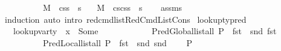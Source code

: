 \begin{isabellebody}
\ \ \ \ \ \ \ \ \ \ {\isachardoublequoteopen}M{\isacharcomma}{\kern0pt}{\isasymLambda}{\isacharcomma}{\kern0pt}{\isasymGamma}{\isacharcomma}{\kern0pt}{\isasymOmega}\ {\isasymturnstile}\ {\isasymlangle}cs{}{\isacharcomma}{\kern0pt}s{\isacharprime}{\kern0pt}{\isacharprime}{\kern0pt}{\isasymrangle}\ {\isacharbrackleft}{\kern0pt}{\isasymrightarrow}{\isacharbrackright}{\kern0pt}\ s{\isacharprime}{\kern0pt}{\isachardoublequoteclose}\isanewline
\ \ \ {\isachardoublequoteopen}M{\isacharcomma}{\kern0pt}{\isasymLambda}{\isacharcomma}{\kern0pt}{\isasymGamma}{\isacharcomma}{\kern0pt}{\isasymOmega}\ {\isasymturnstile}\ {\isasymlangle}cs{}{\isacharat}{\kern0pt}cs{}{\isacharcomma}{\kern0pt}s{\isasymrangle}\ {\isacharbrackleft}{\kern0pt}{\isasymrightarrow}{\isacharbrackright}{\kern0pt}\ s{\isacharprime}{\kern0pt}{\isachardoublequoteclose}\isanewline
%
\isadelimproof
\ \ %
\endisadelimproof
%
\isatagproof
{}\isamarkupfalse%
\ assms\isanewline
\ \ \isamarkupfalse%
\ {\isacharparenleft}{\kern0pt}induction{\isacharparenright}{\kern0pt}\ {\isacharparenleft}{\kern0pt}auto\ intro{\isacharcolon}{\kern0pt}\ red{\isacharunderscore}{\kern0pt}cmd{\isacharunderscore}{\kern0pt}list{\isachardot}{\kern0pt}RedCmdListCons{\isacharparenright}{\kern0pt}%
\endisatagproof
{\isafoldproof}%
%
\isadelimproof
\isanewline
%
\endisadelimproof
\isanewline
{}\isamarkupfalse%
\isanewline
\isanewline
\isanewline
{}\isamarkupfalse%
\ lookup{\isacharunderscore}{\kern0pt}ty{\isacharunderscore}{\kern0pt}pred{\isacharcolon}{\kern0pt}\isanewline
\ \ \ {\isachardoublequoteopen}lookup{\isacharunderscore}{\kern0pt}var{\isacharunderscore}{\kern0pt}ty\ {\isasymLambda}\ x\ {\isacharequal}{\kern0pt}\ Some\ {\isasymtau}{\isachardoublequoteclose}\ \isanewline
\ \ \ \ \ \ \ \ \ \ PredGlobal{\isacharcolon}{\kern0pt}{\isachardoublequoteopen}list{\isacharunderscore}{\kern0pt}all\ {\isacharparenleft}{\kern0pt}P\ {\isasymcirc}\ fst\ {\isasymcirc}\ snd{\isacharparenright}{\kern0pt}\ {\isacharparenleft}{\kern0pt}fst\ {\isasymLambda}{\isacharparenright}{\kern0pt}{\isachardoublequoteclose}\ \isanewline
\ \ \ \ \ \ \ \ \ \ PredLocal{\isacharcolon}{\kern0pt}{\isachardoublequoteopen}list{\isacharunderscore}{\kern0pt}all\ {\isacharparenleft}{\kern0pt}P\ {\isasymcirc}\ fst\ {\isasymcirc}\ snd{\isacharparenright}{\kern0pt}\ {\isacharparenleft}{\kern0pt}snd\ {\isasymLambda}{\isacharparenright}{\kern0pt}{\isachardoublequoteclose}\isanewline
\ \ \ {\isachardoublequoteopen}P\ {\isasymtau}{\isachardoublequoteclose}\isanewline

\end{isabellebody}
